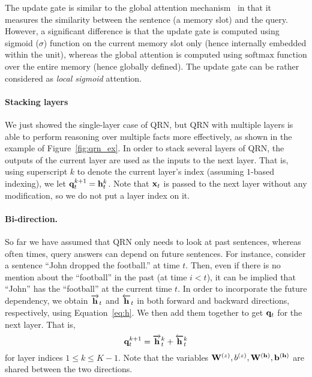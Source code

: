 \documentclass[table]{article}
\begin{document}
The update gate is similar to the global attention mechanism~\citep{memN2N,DMN+} in that it measures the similarity between the sentence (a memory slot) and the query.
However, a significant difference is that the update gate is computed using sigmoid ($\sigma$) function on the current memory slot only (hence internally embedded within the unit), whereas the global attention is computed using $\mathrm{softmax}$ function over the entire memory (hence globally defined).
The update gate can be rather considered as \emph{local sigmoid} attention.

\paragraph{Stacking layers} We just showed the single-layer case of QRN, but QRN with multiple layers is able to perform reasoning over multiple facts more effectively, as shown in the example of Figure~\ref{fig:qrn_ex}.
In order to stack several layers of QRN, the outputs of the current layer are used as the inputs to the next layer. 
That is, using superscript $k$ to denote the current layer's index (assuming $1$-based indexing), we let 
${\bf q}^{k+1}_t = {\bf h}^k_t$.
Note that ${\bf x}_t$ is passed to the next layer without any modification, so we do not put a layer index on it.

\paragraph{Bi-direction.}
So far we have assumed that QRN only needs to look at past sentences, whereas
often times, query answers can depend on future sentences.
For instance, consider a sentence ``John dropped the football.'' at time $t$.
Then, even if there is no mention about the ``football'' in the past (at time $i < t$), 
it can be implied that ``John'' has the ``football'' at the current time $t$. 
In order to incorporate the future dependency, we obtain $\overrightarrow{{\bf h}}_t$ and $\overleftarrow{{\bf h}}_t$ in both forward and backward directions, respectively, using Equation~\ref{eq:h}. We then  add them together to get ${\bf q}_t$ for the next layer. That is,
\begin{equation}
{\bf q}^{k+1}_t = \overrightarrow{{\bf h}}^k_t + \overleftarrow{{\bf h}}^k_t
\end{equation}
for layer indices $1 \leq k \leq K-1$.
Note that  the variables ${\bf W}^{(z)}, b^{(z)}, {\bf W}^{({\bf h})}, {\bf b}^{({\bf h})}$ are shared between the two directions.
\end{document}
